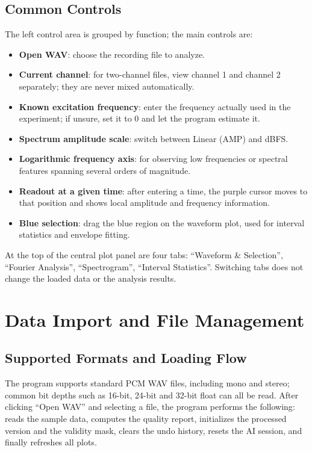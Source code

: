 \documentclass[UTF8,a4paper,12pt]{ctexart}
\begin{document}
\subsection{Common Controls}

The left control area is grouped by function; the main controls are:

\begin{itemize}
  \item \textbf{Open WAV}: choose the recording file to analyze.
  \item \textbf{Current channel}: for two-channel files, view channel 1 and channel 2 separately; they are never mixed automatically.
  \item \textbf{Known excitation frequency}: enter the frequency actually used in the experiment; if unsure, set it to 0 and let the program estimate it.
  \item \textbf{Spectrum amplitude scale}: switch between Linear (AMP) and dBFS.
  \item \textbf{Logarithmic frequency axis}: for observing low frequencies or spectral features spanning several orders of magnitude.
  \item \textbf{Readout at a given time}: after entering a time, the purple cursor moves to that position and shows local amplitude and frequency information.
  \item \textbf{Blue selection}: drag the blue region on the waveform plot, used for interval statistics and envelope fitting.
\end{itemize}

At the top of the central plot panel are four tabs: ``Waveform \& Selection'', ``Fourier Analysis'', ``Spectrogram'', ``Interval Statistics''. Switching tabs does not change the loaded data or the analysis results.

\section{Data Import and File Management}

\subsection{Supported Formats and Loading Flow}

The program supports standard PCM WAV files, including mono and stereo; common bit depths such as 16-bit, 24-bit and 32-bit float can all be read. After clicking ``Open WAV'' and selecting a file, the program performs the following: reads the sample data, computes the quality report, initializes the processed version and the validity mask, clears the undo history, resets the AI session, and finally refreshes all plots.
\end{document}
